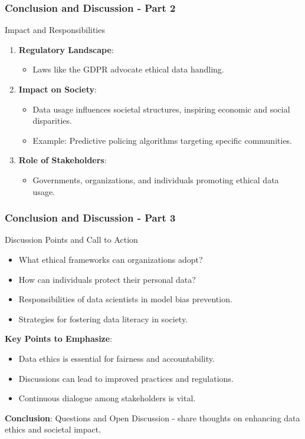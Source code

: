 \documentclass[aspectratio=169]{beamer}
\begin{document}
\begin{frame}[fragile]
    \frametitle{Conclusion and Discussion - Part 2}
    \begin{block}{Impact and Responsibilities}
        \begin{enumerate}
            \item \textbf{Regulatory Landscape}:
            \begin{itemize}
                \item Laws like the GDPR advocate ethical data handling.
            \end{itemize}

            \item \textbf{Impact on Society}:
            \begin{itemize}
                \item Data usage influences societal structures, inspiring economic and social disparities.
                \item Example: Predictive policing algorithms targeting specific communities.
            \end{itemize}

            \item \textbf{Role of Stakeholders}:
            \begin{itemize}
                \item Governments, organizations, and individuals promoting ethical data usage.
            \end{itemize}
        \end{enumerate}
    \end{block}
\end{frame}

\begin{frame}[fragile]
    \frametitle{Conclusion and Discussion - Part 3}
    \begin{block}{Discussion Points and Call to Action}
        \begin{itemize}
            \item What ethical frameworks can organizations adopt?
            \item How can individuals protect their personal data?
            \item Responsibilities of data scientists in model bias prevention.
            \item Strategies for fostering data literacy in society.
        \end{itemize}

        \textbf{Key Points to Emphasize}:
        \begin{itemize}
            \item Data ethics is essential for fairness and accountability.
            \item Discussions can lead to improved practices and regulations.
            \item Continuous dialogue among stakeholders is vital.
        \end{itemize}

        \textbf{Conclusion}: 
        Questions and Open Discussion - share thoughts on enhancing data ethics and societal impact.
    \end{block}
\end{frame}
\end{document}
